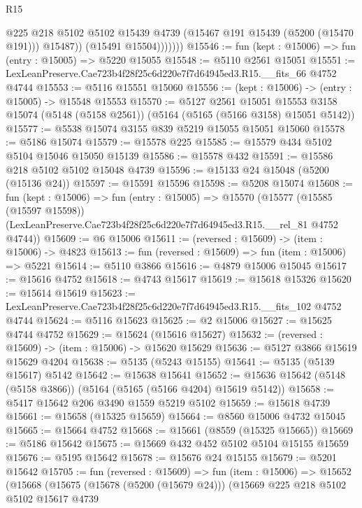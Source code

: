 \begin{lexlean}{R15}
\begin{coremodule}
{{{{{{{{{{{                    @225
                    @218
                    @5102
                    @5102
                    @15439
                    @4739
                    (@15467 @191 @15439 (@5200 (@15470 @191)))
                    @15487))
                (@15491 @15504)))))))
@15546 := fun (kept : @15006) => fun (entry : @15005) => @5220 @15055
@15548 := @5110 @2561 @15051
@15551 := LexLeanPreserve.Cae723b4f28f25c6d220e7f7d64945ed3.R15.__fits_66 @4752 @4744
@15553 := @5116 @15551 @15060
@15556 := (kept : @15006) -> (entry : @15005) -> @15548 @15553
@15570 := @5127
    @2561
    @15051
    @15553
    @3158
    @15074
    (@5148 (@5158 @2561))
    (@5164 (@5165 (@5166 @3158) @15051 @5142))
@15577 := @5538 @15074 @3155 @839 @5219 @15055 @15051 @15060
@15578 := @5186 @15074
@15579 := @15578 @225
@15585 := @15579 @434 @5102 @5104 @15046 @15050 @15139
@15586 := @15578 @432
@15591 := @15586 @218 @5102 @5102 @15048 @4739
@15596 := @15133 @24 @15048 (@5200 (@15136 @24))
@15597 := @15591 @15596
@15598 := @5208 @15074
@15608 := fun (kept : @15006) =>
  fun (entry : @15005) =>
  @15570
    (@15577
      (@15585 (@15597 @15598))
      (LexLeanPreserve.Cae723b4f28f25c6d220e7f7d64945ed3.R15.__rel_81 @4752 @4744))
@15609 := @6 @15006
@15611 := (reversed : @15609) -> (item : @15006) -> @4823
@15613 := fun (reversed : @15609) => fun (item : @15006) => @5221
@15614 := @5110 @3866
@15616 := @4879 @15006 @15045
@15617 := @15616 @4752
@15618 := @4743 @15617
@15619 := @15618 @15326
@15620 := @15614 @15619
@15623 := LexLeanPreserve.Cae723b4f28f25c6d220e7f7d64945ed3.R15.__fits_102 @4752 @4744
@15624 := @5116 @15623
@15625 := @2 @15006
@15627 := @15625 @4744 @4752
@15629 := @15624 (@15616 @15627)
@15632 := (reversed : @15609) -> (item : @15006) -> @15620 @15629
@15636 := @5127 @3866 @15619 @15629 @4204
@15638 := @5135 (@5243 @15155)
@15641 := @5135 (@5139 @15617) @5142
@15642 := @15638 @15641
@15652 := @15636 @15642 (@5148 (@5158 @3866)) (@5164 (@5165 (@5166 @4204) @15619 @5142))
@15658 := @5417 @15642 @206 @3490 @1559 @5219 @5102
@15659 := @15618 @4739
@15661 := @15658 (@15325 @15659)
@15664 := @8560 @15006 @4732 @15045
@15665 := @15664 @4752
@15668 := @15661 (@8559 (@15325 @15665))
@15669 := @5186 @15642
@15675 := @15669 @432 @452 @5102 @5104 @15155 @15659
@15676 := @5195 @15642
@15678 := @15676 @24 @15155
@15679 := @5201 @15642
@15705 := fun (reversed : @15609) =>
  fun (item : @15006) =>
  @15652
    (@15668
      (@15675
        (@15678 (@5200 (@15679 @24)))
        (@15669
          @225
          @218
          @5102
          @5102
          @15617
          @4739
}}}}}}}}}}}
\end{coremodule}
\end{lexlean}
